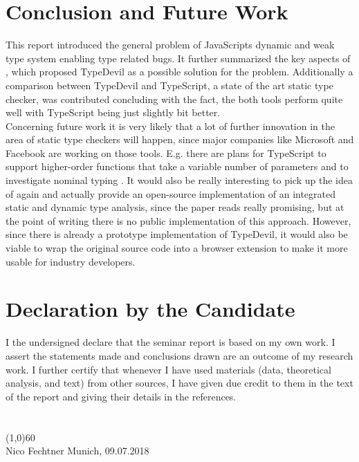 \documentclass[runningheads,a4paper]{llncs}
\begin{document}
\section{Conclusion and Future Work}
This report introduced the general problem of JavaScripts dynamic and weak type system enabling type related bugs.
It further summarized the key aspects of \cite{DBLP:conf/icse/PradelSS15}, which proposed TypeDevil as a possible solution for the problem.
Additionally a comparison between TypeDevil and TypeScript, a state of the art static type checker, was contributed concluding with the fact, the both tools perform quite well with TypeScript being just slightly bit better.\\
Concerning future work it is very likely that a lot of further innovation in the area of static type checkers will happen, since major companies like Microsoft and Facebook are working on those tools.
E.g. there are plans for TypeScript to support higher-order functions that take a variable number of parameters and to investigate nominal typing \cite{TsRoadmap}.
It would also be really interesting to pick up the idea of \cite{DBLP:conf/icse/TanXCLYS17} again and actually provide an open-source implementation of an integrated static and dynamic type analysis, since the paper reads really promising, but at the point of writing there is no public implementation of this approach. 
However, since there is already a prototype implementation of TypeDevil, it would also be viable to wrap the original source code into a browser extension to make it more usable for industry developers.


\newpage

{}


\newpage

\section*{Declaration by the Candidate}
I the undersigned declare that the seminar report is based on my own work.
I assert the statements made and conclusions drawn are an outcome of my research work. I further certify that whenever I have used materials (data, theoretical analysis, and text) from other sources, I have given due credit to them in the text of the report and giving their details in the references.
\\ \\ \\
\line(1,0){60}\\
Nico Fechtner
\hfill
Munich, 09.07.2018
\end{document}
